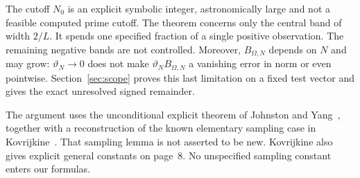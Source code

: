 \documentclass[11pt]{article}
\theoremstyle{remark}\newtheorem{remark}[theorem]{Remark}
\numberwithin{equation}{section}
\begin{document}
The cutoff $N_0$ is an explicit symbolic integer, astronomically large and not a feasible computed prime cutoff. The theorem concerns only the central band of width $2/L$. It spends one specified fraction of a single positive observation. The remaining negative bands are not controlled. Moreover, $B_{\Omega,N}$ depends on $N$ and may grow: $\vartheta_N\to0$ does not make $\vartheta_NB_{\Omega,N}$ a vanishing error in norm or even pointwise. Section~\ref{sec:scope} proves this last limitation on a fixed test vector and gives the exact unresolved signed remainder.

The argument uses the unconditional explicit theorem of Johnston and Yang~\cite{JY}, together with a reconstruction of the known elementary sampling case in Kovrijkine~\cite[Remark~1, pp.~8--9]{Kov}. That sampling lemma is not asserted to be new. Kovrijkine also gives explicit general constants on page~8. No unspecified sampling constant enters our formulas.
\end{document}
